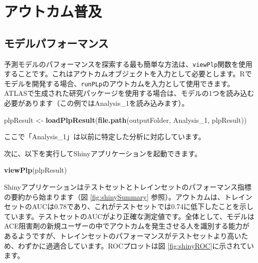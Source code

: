 \documentclass[
  11pt]{book}
\newenvironment{Shaded}{\begin{snugshade}}{\end{snugshade}}
\newcommand{\FunctionTok}[1]{\textcolor[rgb]{0.13,0.29,0.53}{\textbf{#1}}}
\newcommand{\NormalTok}[1]{#1}
\newcommand{\OtherTok}[1]{\textcolor[rgb]{0.56,0.35,0.01}{#1}}
\newcommand{\StringTok}[1]{\textcolor[rgb]{0.31,0.60,0.02}{#1}}
\theoremstyle{definition}
\theoremstyle{definition}
\theoremstyle{definition}
\theoremstyle{definition}
\theoremstyle{remark}
\begin{document}
\section{アウトカム普及}\label{ux30a2ux30a6ux30c8ux30abux30e0ux666eux53ca}

\subsection{モデルパフォーマンス}\label{ux30e2ux30c7ux30ebux30d1ux30d5ux30a9ux30fcux30deux30f3ux30b9}

予測モデルのパフォーマンスを探索する最も簡単な方法は、\texttt{viewPlp}関数を使用することです。これはアウトカムオブジェクトを入力として必要とします。Rでモデルを開発する場合、\texttt{runPLp}のアウトカムを入力として使用できます。ATLASで生成された研究パッケージを使用する場合は、モデルの1つを読み込む必要があります（この例ではAnalysis\_1を読み込みます）。

\begin{Shaded}
\begin{Highlighting}[]
\NormalTok{plpResult }\OtherTok{\textless{}{-}} \FunctionTok{loadPlpResult}\NormalTok{(}\FunctionTok{file.path}\NormalTok{(outputFolder,}
                                     \StringTok{\textquotesingle{}Analysis\_1\textquotesingle{}}\NormalTok{,}
                                     \StringTok{\textquotesingle{}plpResult\textquotesingle{}}\NormalTok{))}
\end{Highlighting}
\end{Shaded}

ここで「Analysis\_1」は以前に特定した分析に対応しています。

次に、以下を実行してShinyアプリケーションを起動できます。

\begin{Shaded}
\begin{Highlighting}[]
\FunctionTok{viewPlp}\NormalTok{(plpResult)}
\end{Highlighting}
\end{Shaded}

Shinyアプリケーションはテストセットとトレインセットのパフォーマンス指標の要約から始まります（図 \ref{fig:shinySummary} 参照）。アウトカムは、トレインセットのAUCは0.78であり、これがテストセットでは0.74に低下したことを示しています。テストセットのAUCがより正確な測定値です。全体として、モデルはACE阻害剤の新規ユーザーの中でアウトカムを発生させる人を識別する能力があるようですが、トレインセットのパフォーマンスがテストセットより高いため、わずかに過適合しています。ROCプロットは図 \ref{fig:shinyROC}に示されています。
\end{document}
